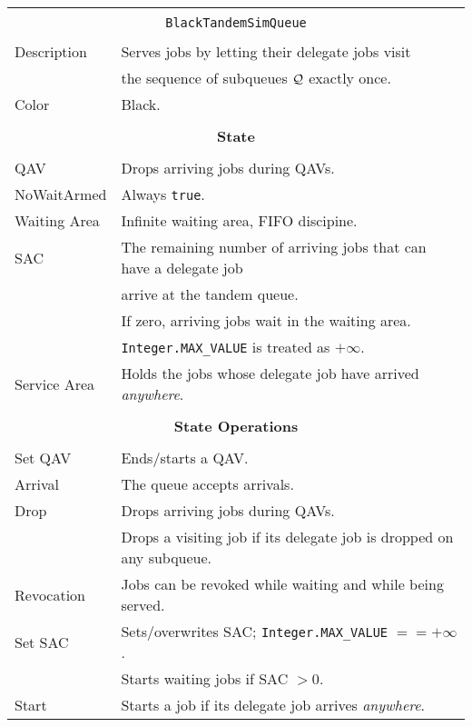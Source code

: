 \documentclass[12pt]{book}
\begin{document}
\begin{tabular}{|l|l|}
\hline
\multicolumn{2}{|c|}{} \\
\multicolumn{2}{|c|}{\lstinline[basicstyle=\large]{BlackTandemSimQueue}} \\
\multicolumn{2}{|c|}{} \\
\hline
Description & Serves jobs by letting their delegate jobs visit \\
            & the sequence of subqueues $\cal{Q}$ exactly once. \\
\hline
Color       & Black. \\
\hline
\multicolumn{2}{|c|}{} \\
\multicolumn{2}{|c|}{\bf State} \\
\multicolumn{2}{|c|}{} \\
\hline
QAV & Drops arriving jobs during QAVs. \\
\hline
NoWaitArmed & Always \lstinline|true|. \\
\hline
Waiting Area & Infinite waiting area, FIFO discipine. \\
\hline
SAC & The remaining number of arriving jobs that can have a delegate job \\
    & arrive at the tandem queue. \\
    & If zero, arriving jobs wait in the waiting area. \\
    & \lstinline|Integer.MAX_VALUE| is treated as $+\infty$. \\
\hline
Service Area & Holds the jobs whose delegate job have arrived {\em anywhere}. \\
\hline
\multicolumn{2}{|c|}{} \\
\multicolumn{2}{|c|}{\bf State Operations} \\
\multicolumn{2}{|c|}{} \\
\hline
Set QAV & Ends/starts a QAV. \\
\hline
Arrival & The queue accepts arrivals. \\
\hline
Drop & Drops arriving jobs during QAVs. \\
     & Drops a visiting job if its delegate job is dropped on any subqueue. \\
\hline
Revocation & Jobs can be revoked while waiting and while being served. \\
\hline
Set SAC & Sets/overwrites SAC; \lstinline|Integer.MAX_VALUE| $== +\infty$. \\
        & Starts waiting jobs if SAC $> 0$. \\
\hline
Start & Starts a job if its delegate job arrives {\em anywhere}. \\

\end{tabular}
\end{document}
